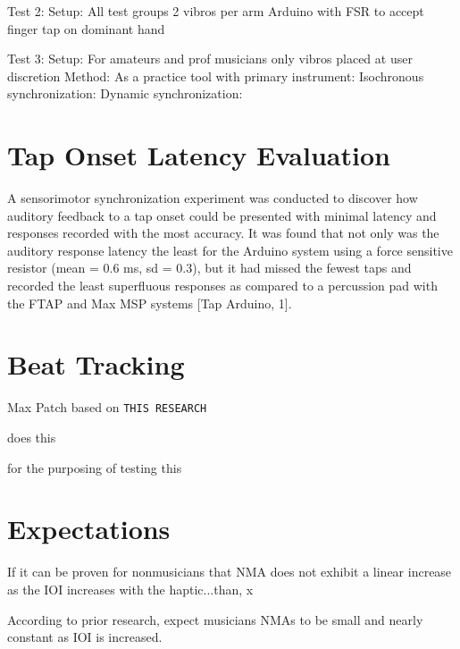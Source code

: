 Test 2:
    Setup:
        All test groups    
        2 vibros per arm
        Arduino with FSR to accept finger tap on dominant hand

Test 3:
    Setup:
        For amateurs and prof musicians only
        vibros placed at user discretion   
    Method:
        As a practice tool with primary instrument:
            Isochronous synchronization:
            Dynamic synchronization: 


\section{Tap Onset Latency Evaluation}

A sensorimotor synchronization experiment was conducted to discover how auditory feedback to a tap onset could be presented with minimal latency and responses recorded with the most accuracy. It was found that not only was the auditory response latency the least for the Arduino system using a force sensitive resistor (mean = 0.6 ms, sd = 0.3), but it had missed the fewest taps and recorded the least superfluous responses as compared to a percussion pad with the FTAP and Max MSP systems [Tap Arduino, 1].


\section{Beat Tracking}

Max Patch based on \verb!THIS RESEARCH! 

does this

for the purposing of testing this

\section{Expectations}

If it can be proven for nonmusicians that NMA does not exhibit a linear increase as the IOI increases with the haptic...than, x

According to prior research, expect musicians NMAs to be small and nearly constant as IOI is increased.\cite{repp2013sensorimotor,4}




